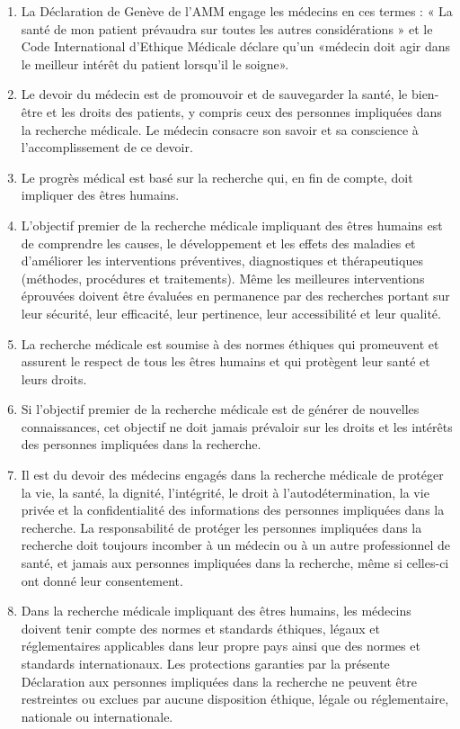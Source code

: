 \documentclass[
  12pt,
]{book}
\begin{document}
\begin{enumerate}
\def\labelenumi{\arabic{enumi}.}
\setcounter{enumi}{2}
\item
  La Déclaration de Genève de l'AMM engage les médecins en ces termes : « La santé de mon patient prévaudra sur toutes les autres considérations » et le Code International d'Ethique Médicale déclare qu'un «médecin doit agir dans le meilleur intérêt du patient lorsqu'il le soigne».
\item
  Le devoir du médecin est de promouvoir et de sauvegarder la santé, le bien-être et les droits des patients, y compris ceux des personnes impliquées dans la recherche médicale. Le médecin consacre son savoir et sa conscience à l'accomplissement de ce devoir.
\item
  Le progrès médical est basé sur la recherche qui, en fin de compte, doit impliquer des êtres humains.
\item
  L'objectif premier de la recherche médicale impliquant des êtres humains est de comprendre les causes, le développement et les effets des maladies et d'améliorer les interventions préventives, diagnostiques et thérapeutiques (méthodes, procédures et traitements). Même les meilleures interventions éprouvées doivent être évaluées en permanence par des recherches portant sur leur sécurité, leur efficacité, leur pertinence, leur accessibilité et leur qualité.
\item
  La recherche médicale est soumise à des normes éthiques qui promeuvent et assurent le respect de tous les êtres humains et qui protègent leur santé et leurs droits.
\item
  Si l'objectif premier de la recherche médicale est de générer de nouvelles connaissances, cet objectif ne doit jamais prévaloir sur les droits et les intérêts des personnes impliquées dans la recherche.
\item
  Il est du devoir des médecins engagés dans la recherche médicale de protéger la vie, la santé, la dignité, l'intégrité, le droit à l'autodétermination, la vie privée et la confidentialité des informations des personnes impliquées dans la recherche. La responsabilité de protéger les personnes impliquées dans la recherche doit toujours incomber à un médecin ou à un autre professionnel de santé, et jamais aux personnes impliquées dans la recherche, même si celles-ci ont donné leur consentement.
\item
  Dans la recherche médicale impliquant des êtres humains, les médecins doivent tenir compte des normes et standards éthiques, légaux et réglementaires applicables dans leur propre pays ainsi que des normes et standards internationaux. Les protections garanties par la présente Déclaration aux personnes impliquées dans la recherche ne peuvent être restreintes ou exclues par aucune disposition éthique, légale ou réglementaire, nationale ou internationale.

\end{enumerate}
\end{document}
